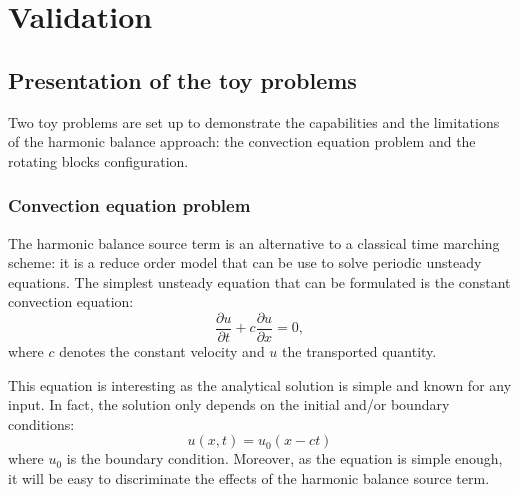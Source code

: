 \chapter{Validation} %
\label{cha:validation}

\section{Presentation of the toy problems}

Two toy problems are set up to demonstrate
the capabilities and the limitations of the harmonic
balance approach:
the convection equation problem and the rotating blocks configuration.

\subsection{Convection equation problem} %
\label{sub:convection_equation_problem}

The harmonic balance source term is an alternative to
a classical time marching scheme: it is a reduce
order model that can be use to solve periodic unsteady equations.
The simplest unsteady equation
that can be formulated is the constant convection equation:
\begin{equation}
  \label{eq:convection}
  \frac{\partial u}{\partial t} + c \frac{\partial u}{\partial x} = 0,
\end{equation}
where $c$ denotes the constant velocity and $u$ the transported quantity.

This equation is interesting as the analytical solution is simple
and known for any input. In fact, the solution only depends on the 
initial and/or boundary conditions:
\begin{equation}
  \label{eq:solconvanalytic}
    u(x, t) = u_0(x - ct)
\end{equation}
where $u_0$ is the boundary condition. Moreover, as the equation
is simple enough, it will be easy to discriminate the effects of the
harmonic balance source term.

